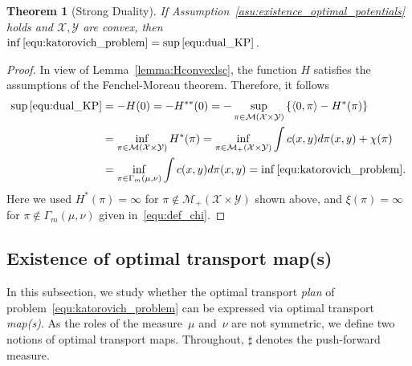\documentclass{article}
\newtheorem{theorem}{Theorem}[section]
\theoremstyle{definition}
\begin{document}
\begin{theorem}[Strong Duality]\label{the:strong_duality}
If Assumption~\ref{asu:existence_optimal_potentials} holds and $\mathcal X, \mathcal Y$ are convex, then $\inf \eqref{equ:katorovich_problem} = \sup \eqref{equ:dual_KP}$.
\end{theorem}
\begin{proof}
    In view of Lemma~\ref{lemma:Hconvexlsc}, the function $H$ satisfies the assumptions of the Fenchel-Moreau theorem. Therefore, it follows
    \begin{align*}
	\sup \eqref{equ:dual_KP} &= -H(0) = -H^{**}(0) = - \sup_{\pi \in \mathcal M (\mathcal X \times \mathcal Y)}  \left\lbrace \langle 0, \pi \rangle - H^*(\pi) \right\rbrace \\
    & = \inf_{\pi \in \mathcal M (\mathcal X \times \mathcal Y)} H^*(\pi) = \inf_{\pi \in \mathcal{M}_+ (\mathcal X \times \mathcal Y)} \int c(x,y) d \pi(x,y) +\chi (\pi) \\
    & = \inf_{\pi \in \Gamma_m (\mu, \nu)} \int c(x,y) d \pi(x,y) = \inf \eqref{equ:katorovich_problem}.
	\end{align*}
    Here we used $H^*(\pi) = \infty$ for $\pi \not \in \mathcal M_+(\mathcal X \times \mathcal Y)$ shown above, and $\xi(\pi) = \infty$ for $\pi \not \in \Gamma_m (\mu, \nu)$ given in~\eqref{equ:def_chi}.
\end{proof}





\subsection{Existence of optimal transport map(s)}\label{sec:existence_optimal_transport_map}

In this subsection, we study whether the optimal transport \textit{plan} of problem~\eqref{equ:katorovich_problem} can be expressed via optimal transport \textit{map(s)}. As the roles of the measure~$\mu$ and~$\nu$ are not symmetric, we define two notions of optimal transport maps. Throughout, $\sharp$ denotes the push-forward measure.
\end{document}
